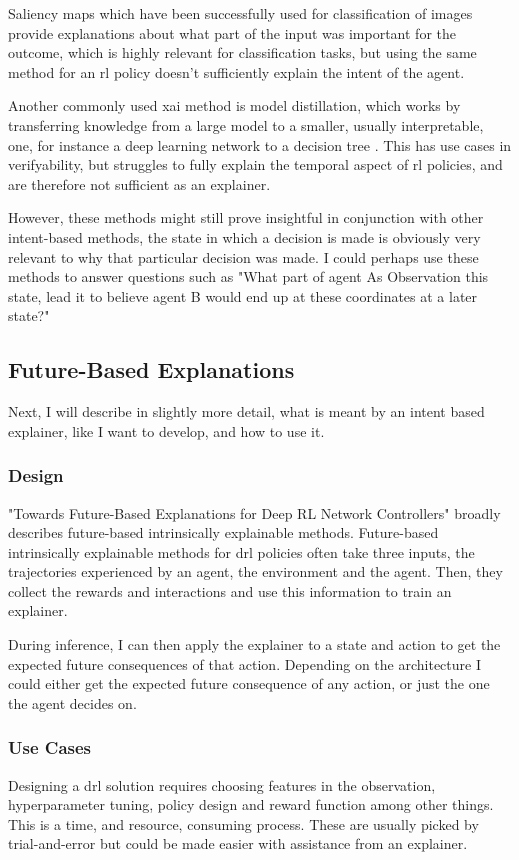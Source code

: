 \documentclass[UKenglish]{uiomasterthesis}
\begin{document}
Saliency maps which have been successfully used for classification of images provide explanations about what part of the input was important for the outcome, which is highly relevant for classification tasks, but using the same method for an \ac{rl} policy doesn't sufficiently explain the intent of the agent\cite{atrey2020exploratory}.

Another commonly used \ac{xai} method is model distillation, which works by transferring knowledge from a large model to a smaller, usually interpretable, one, for instance a deep learning network to a decision tree \cite{bastani2019verifiable}. This has use cases in verifyability, but struggles to fully explain the temporal aspect of \ac{rl} policies, and are therefore not sufficient as an explainer.

However, these methods might still prove insightful in conjunction with other intent-based methods, the state in which a decision is made is obviously very relevant to why that particular decision was made. I could perhaps use these methods to answer questions such as "What part of agent As Observation this state, lead it to believe agent B would end up at these coordinates at a later state?"


\subsection{Future-Based Explanations}
Next, I will describe in slightly more detail, what is meant by an intent based explainer, like I want to develop, and how to use it.

\subsubsection{Design}
"Towards Future-Based Explanations for Deep RL Network Controllers"\cite{10.1145/3626570.3626607} broadly describes future-based intrinsically explainable methods. Future-based intrinsically explainable methods for \ac{drl} policies often take three inputs, the trajectories experienced by an agent, the environment and the agent. Then, they collect the rewards and interactions and use this information to train an explainer.

During inference, I can then apply the explainer to a state and action to get the expected future consequences of that action. Depending on the architecture I could either get the expected future consequence of any action, or just the one the agent decides on.

\subsubsection{Use Cases}
Designing a \ac{drl} solution requires choosing features in the observation, hyperparameter tuning, policy design and reward function among other things. This is a time, and resource, consuming process. These are usually picked by trial-and-error but could be made easier with assistance from an explainer.
\end{document}
